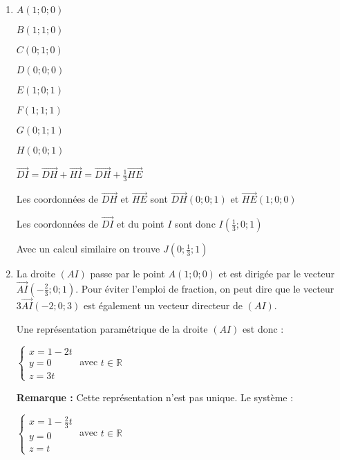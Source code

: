 \begin{corrige}
     \begin{enumerate}
          \item
          $A\left(1 ; 0 ; 0\right)$
          \par
          $B\left(1 ; 1 ; 0\right)$
          \par
          $C\left(0 ; 1 ; 0\right)$
          \par
          $D\left(0 ; 0 ; 0\right)$
          \par
          $E\left(1 ; 0 ; 1\right)$
          \par
          $F\left(1 ; 1 ; 1\right)$
          \par
          $G\left(0 ; 1 ; 1\right)$
          \par
          $H\left(0 ; 0 ; 1\right)$
          \par
          $\overrightarrow{DI}=\overrightarrow{DH}+\overrightarrow{HI} = \overrightarrow{DH}+\frac{1}{3}\overrightarrow{HE}$
          \par
          Les coordonnées de $\overrightarrow{DH}$ et $\overrightarrow{HE}$ sont $\overrightarrow{DH} \left(0 ; 0 ; 1\right)$ et $\overrightarrow{HE} \left(1 ; 0 ; 0\right)$
          \par
          Les coordonnées de $\overrightarrow{DI}$ et du point $I$ sont donc $I \left(\frac{1}{3} ; 0 ; 1\right)$
          \par
          Avec un calcul similaire on trouve $J \left(0 ; \frac{1}{3} ; 1\right)$
          \item
          La droite $\left(AI\right)$ passe par le point $A\left(1 ; 0 ; 0\right)$ et est dirigée par le vecteur $\overrightarrow{AI}\left(-\frac{2}{3} ; 0 ; 1\right)$. Pour éviter l'emploi de fraction, on peut dire que le vecteur $3\overrightarrow{AI}\left(-2 ; 0 ; 3\right)$ est également un vecteur directeur de $\left(AI\right)$.
          \par
          Une représentation paramétrique de la droite $\left(AI\right)$ est donc :
          \begin{center}$\left\{ \begin{matrix} x=1-2t \\ y=0 \\ z=3t \end{matrix}\right.      $  avec $t \in  \mathbb{R}$\end{center}
               \textbf{Remarque : }Cette représentation n'est pas unique. Le système :
               \begin{center}$\left\{ \begin{matrix} x=1-\frac{2}{3}t \\ y=0 \\ z=t \end{matrix}\right.      $  avec $t \in  \mathbb{R}$\end{center}

\end{enumerate}
\end{corrige}

